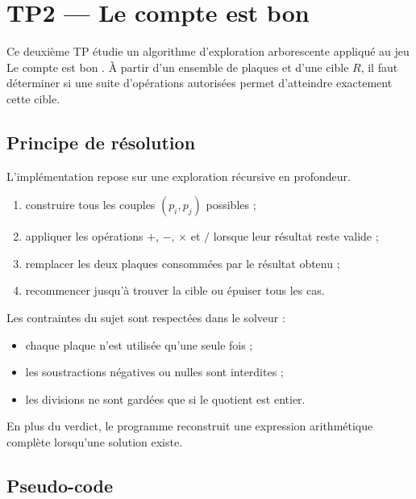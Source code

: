 \section{TP2 --- Le compte est bon}\label{sec:tp2}

Ce deuxi\`{e}me TP \'{e}tudie un algorithme d'exploration arborescente appliqu\'{e}
au jeu \og{} Le compte est bon \fg{}. \`{A} partir d'un ensemble de plaques et d'une
cible \(R\), il faut d\'{e}terminer si une suite d'op\'{e}rations autoris\'{e}es permet
d'atteindre exactement cette cible.

\subsection{Principe de r\'{e}solution}\label{subsec:tp2-principe}

L'impl\'{e}mentation repose sur une exploration r\'{e}cursive en profondeur.

\begin{enumerate}
	\item construire tous les couples \((p_i, p_j)\) possibles ;
	\item appliquer les op\'{e}rations \(+\), \(-\), \(\times\) et \(/\) lorsque
	      leur r\'{e}sultat reste valide ;
	\item remplacer les deux plaques consomm\'{e}es par le r\'{e}sultat obtenu ;
	\item recommencer jusqu'\`{a} trouver la cible ou \'{e}puiser tous les cas.
\end{enumerate}

Les contraintes du sujet sont respect\'{e}es dans le solveur :

\begin{itemize}
	\item chaque plaque n'est utilis\'{e}e qu'une seule fois ;
	\item les soustractions n\'{e}gatives ou nulles sont interdites ;
	\item les divisions ne sont gard\'{e}es que si le quotient est entier.
\end{itemize}

En plus du verdict, le programme reconstruit une expression arithm\'{e}tique
compl\`{e}te lorsqu'une solution existe.

\subsection{Pseudo-code}\label{subsec:tp2-pseudocode}

